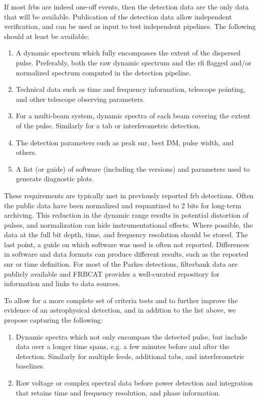 \documentclass[a4paper,fleqn,usenatbib]{mnras}
\begin{document}
If most \glspl{frb} are indeed one-off events, then the detection data are the
only data that will be available. Publication of the detection data allow
independent verification, and can be used as input to test independent
pipelines. The following should at least be available:

\begin{enumerate}
    \item A dynamic spectrum which fully encompasses the extent of the dispersed
    pulse. Preferably, both the raw dynamic spectrum and the \gls{rfi} flagged
    and/or normalized spectrum computed in the detection pipeline.
    \item Technical data such as time and frequency information, telescope
    pointing, and other telescope observing parameters.
    \item For a multi-beam system, dynamic spectra of each beam covering the
    extent of the pulse. Similarly for a \gls{tab} or interferometric detection.
    \item The detection parameters such as peak \gls{snr}, best DM, pulse width,
    and others.
    \item A list (or guide) of software (including the versions) and parameters
    used to generate diagnostic plots.
\end{enumerate}

These requirements are typically met in previously reported \gls{frb}
detections. Often the public data have been normalized and requantized to 2 bits
for long-term archiving. This reduction in the dynamic range results in
potential distortion of pulses, and normalization can hide instrumentational
effects. Where possible, the data at the full bit depth, time, and frequency
resolution should be stored.  The last point, a guide on which software was used
is often not reported.  Differences in software and data formats can produce
different results, such as the reported \gls{snr} or time definition. For most
of the Parkes detections, filterbank data are publicly available and FRBCAT
\citep{2016PASA...33...45P} provides a well-curated repository for information
and links to data sources.

To allow for a more complete set of criteria tests and to further improve the
evidence of an astrophysical detection, and in addition to the list above, we
propose capturing the following:

\begin{enumerate}
    \item Dynamic spectra which not only encompass the detected pulse, but
    include data over a longer time spans, e.g. a few minutes before and after
    the detection. Similarly for multiple feeds, additional \glspl{tab}, and
    interferometric baselines.
    \item Raw voltage or complex spectral data before power detection and
    integration that retains time and frequency resolution, and phase
    information.
\end{enumerate}
\end{document}
